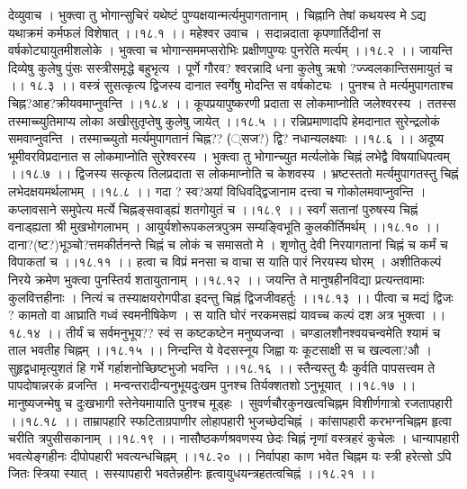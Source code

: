 \documentclass[11pt]{book}
\begin{document}
\begin{landscape}
देव्युवाच ।
भुक्त्वा तु भोगान्सुचिरं यथेष्टं
पुण्यक्षयान्मर्त्यमुपागतानाम् ।
चिह्नानि तेषां कथयस्व मे ऽद्य
यथाक्रमं कर्मफलं विशेषात् ।।१८.१ ।।
महेश्वर उवाच ।
सदान्नदाता कृपणार्तिदीनां
स वर्षकोट्यायुतमीशलोके ।
भुक्त्वा च भोगान्सममप्सरोभिः
प्रक्षीणपुण्यः पुनरेति मर्त्यम् ।।१८.२ ।।
जायन्ति दिव्येषु कुलेषु पुंसः
सस्त्रीसमृद्धे बहुभृत्य ।
पूर्णे गौरव? श्वरन्नादि धना
कुलेषु ऋषो ?ज्ज्वलकान्तिसमायुतं च ।। १८.३ ।।
वस्त्रं सुसत्कृत्य द्विजस्य दानात
स्वर्गेषु मोदन्ति स वर्षकोट्यः ।
पुनश्च ते मर्त्यमुपागताश्च
चिह्न?आह?क्रीयवमाप्नुवन्ति ।।१८.४ ।।
कूपप्रयापुष्करणी प्रदाता
स लोकमाप्नोति जलेश्वरस्य ।
ततस्स तस्माच्च्युतिमाप्य लोका
अखीसुतृप्तेषु कुलेषु जायेत् ।।१८.५ ।।
रन्निप्रमाणादपि हेमदानात
सुरेन्द्रलोकं समवाप्नुवन्ति ।
तस्माच्च्युतो मर्त्यमुपागतानं
चिह्न?? (्सज?) द्वि? नधान्यलक्ष्याः ।।१८.६ ।।
अदूष्य भूमीवरविप्रदानात
स लोकमाप्नोति सुरेश्वरस्य ।
भुक्त्वा तु भोगान्च्युत मर्त्यलोके
चिह्नं लभेद्वै विषयाधिपत्वम् ।।१८.७ ।।
द्विजस्य सत्कृत्य तिलप्रदाता स
लोकमाप्नोति च केशवस्य ।
भ्रष्टस्ततो मर्त्यमुपागतस्तु
चिह्नं लभेदक्षयमर्थलाभम् ।।१८.८ ।।
गदा ? स्व?अयां विधिवद्द्विजानाम
दत्त्वा च गोकोलमवाप्नुवन्ति ।
कप्लावसाने समुपेत्य मर्त्ये
चिह्नङ्सवाड्ह्यं शतगोयुतं च ।।१८.९ ।।
स्वर्गं सतानां पुरुषस्य चिह्नं
वनाड्ह्यता श्री मुखभोगलाभम् ।
आयुर्यशोरूपकलत्रपुत्रम
सम्यङ्विभूति कुलकीर्तिमर्थम् ।।१८.१० ।।
दाना?(ष्ट?)भूञ्चो?त्तमकीर्तनन्ते
चिह्नं च लोकं च समासतो मे ।
शृणोतु देवी निरयागतानां
चिह्नं च कर्मं च विपाकतां च ।।१८.११ ।।
हत्वा च विप्रं मनसा च वाचा
स याति पारं निरयस्य घोरम् ।
अशीतिकल्पं निरये क्रमेण
भुक्त्वा पुनस्तिर्य शतायुतानाम् ।।१८.१२ ।।
जयन्ति ते मानुषहीनविद्या
प्रत्यन्तवामाः कुलवित्तहीनाः ।
नित्यं च तस्याक्षयरोगपीडा
इदन्तु चिह्नं द्विजजीवहर्तुः ।।१८.१३ ।।
पीत्वा च मद्यं द्विजः ? कामतो वा
आघ्राति गध्वं स्वमनीषिकेण ।
स याति घोरं नरकमसह्यं
यावच्च कल्पं दश अत्र भुक्त्वा ।।१८.१४ ।।
तीर्यं च सर्वमनुभूय??
स्वं स कष्टकष्टेन मनुष्यजन्वा ।
चण्डालशौनश्वयचन्वमेति
श्यामं च ताल भवतीह चिह्नम् ।।१८.१५ ।।
निन्दन्ति ये वेदसस्नूय जिह्वा
यः कूटसाक्षी स च खल्वला?औ ।
सुहृद्वधामृत्युशतं हि गर्भे
गर्हाशनोच्छिष्टभुजो भवन्ति ।।१८.१६ ।।
स्तैन्यस्तु यैः कुर्वति पापसत्त्वम
ते पापदोषान्नरकं व्रजन्ति ।
मन्वन्तरादीन्यनुभूयदुःखम
पुनश्च तिर्यक्शतशो ऽनुभूयात् ।।१८.१७ ।।
मानुष्यजन्मेषु च दुःखभागी
स्तेनेयमायाति पुनश्च मूड्हः ।
सुवर्णचौरकुनखत्वचिह्नम
विशीर्णगात्रो रजतापहारी ।।१८.१८ ।।
ताम्रापहारि स्फटिताग्रपाणीर
लोहापहारी भुजच्छेदचिह्नं ।
कांसापहारी करभग्नचिह्नम
हृत्वा चरीति त्रपुसीसकानाम् ।।१८.१९ ।।
नासौष्ठकर्णश्रवणस्य छेदः
चिह्नं नृणां वस्त्रहरं कुचेलः ।
धान्यापहारी भवत्येङ्गहीनः
दीपोपहारी भवत्यन्धचिह्नम् ।।१८.२० ।।
निर्वापहा काण भवेत चिह्नम
यः स्त्री हरेत्सो ऽपि जितः स्त्रिया स्यात् ।
सस्यापहारी भवतेन्नहीनः
हृत्वायुधयन्त्रहतत्वचिह्नं ।।१८.२१ ।।

\end{landscape}
\end{document}
